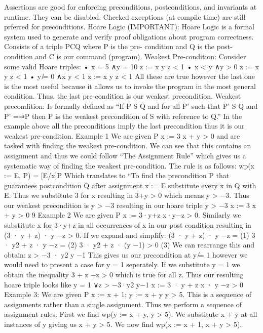 \documentclass[10pt]{article}
\begin{document}
\begin{multicols}{2}
Assertions are good for enforcing preconditions, postconditions, and invariants
at runtime. They can be disabled. Checked exceptions (at compile time) are
still prferred for preconditions.
Hoare Logic (IMPORTANT):
Hoare Logic is a formal system used to generate and verify proof obligations
about program correctness. Consists of a triple {P}C{Q} where P is the pre-
condition and Q is the post-condition and C is our command (program).
Weakest Pre-condition:
Consider some valid Hoare triples:
• {x = 5 ∧y = 10} z := x
y {z < 1}
• {x < y ∧y > 0} z := x
y {z < 1}
• {y ̸= 0 ∧x
y < 1} z := x
y {z < 1}
All these are true however the last one is the most useful because it allows us to
invoke the program in the most general condition. Thus, the last pre-condition
is our weakest precondition.
Weakest precondition: Is formally defined as “If {P} S {Q} and for all
P’ such that {P’} S {Q} and P’ =⇒P then P is the weakest precondition of S
with reference to Q.” In the example above all the preconditions imply the last
precondition thus it is our weakest pre-condition.
Example 1
We are given {P} x := 3 {x + y > 0} and are tasked with finding the weakest
pre-condition. We can see that this contains an assignment and thus we could
follow “The Assignment Rule” which gives us a systematic way of finding the
weakest pre-condition. The rule is as follows:
wp(x := E, P) = [E/x]P
Which translates to “To find the precondition P that guarantees postcondition
Q after assignment x := E substitute every x in Q with E. Thus we substitute 3
for x resulting in 3+y > 0 which means y > −3. Thus our weakest precondition
is y > −3 resulting in our hoare triple {y > −3} x := 3 {x + y > 0}
9
Example 2
We are given {P} x := 3·y+z {x·y−z > 0}. Similarly we substitute x for 3·y+z
in all occurrences of x in our post condition resulting in (3 · y + z) · y −z > 0.
If we expand and simplify:
(3 · y + z) · y −z =
(1)
3 · y2 + z · y −z =
(2)
3 · y2 + z · (y −1) > 0
(3)
We can rearrange this and obtain:
z > −3 · y2
y −1
This gives us our precondition at y ̸= 1 however we would need to present a
case for y = 1 seperately.
If we substitute y = 1 we obtain the inequality
3 + z −z > 0 which is true for all z. Thus our resulting hoare triple looks like
{y = 1 ∨z > −3·y2
y−1 } x := 3 · y + z {x · y −z > 0}
Example 3:
We are given {P} x := x + 1; y := x + y {y > 5}.
This is a sequence of
assignments rather than a single assignment. Thus we perform a sequence of
assignment rules. First we find wp(y := x + y, y > 5). We substitute x + y at
all instances of y giving us x + y > 5. We now find wp(x := x + 1, x + y > 5).

\end{multicols}
\end{document}
